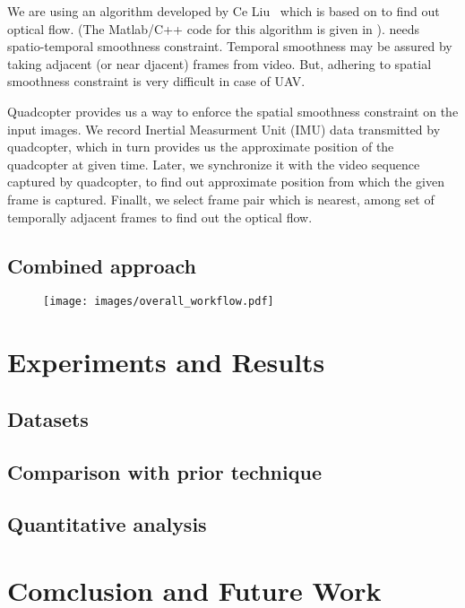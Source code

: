 \documentclass[times,10pt,twocolumn,letterpaper]{article}
\begin{document}
We are using an algorithm  developed by Ce Liu~\cite{Liu11Thesis} which is based
on \cite{Brox04,Bruhn05} to find out optical flow. (The Matlab/C++ code for this
algorithm is given in \cite{Liu11}). \cite{Brox04} needs spatio-temporal
smoothness constraint. Temporal smoothness may be assured by taking adjacent (or
near djacent) frames from video. But, adhering to spatial smoothness constraint
is very difficult in case of UAV. 

Quadcopter provides us a way to enforce the spatial smoothness constraint on
the input images. We record Inertial Measurment Unit (IMU) data
transmitted by quadcopter, which in turn provides us the approximate position of
the quadcopter at given time. Later, we synchronize it with the video sequence
captured by quadcopter, to find out approximate position from which the given
frame is captured. Finallt, we select frame pair which is nearest, among set of
temporally adjacent frames to find out the optical flow.
 
\subsection{Combined approach}
\begin{figure}[h!]
\centering
\texttt{[image: images/overall\_workflow.pdf]}
\caption{}
\label{fig:workflow}
\end{figure}


\section{Experiments and Results}
\subsection{Datasets}

\subsection{Comparison with prior technique}
\subsection{Quantitative analysis}
\section{Comclusion and Future Work}



\end{document}
